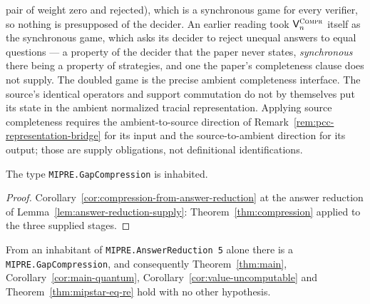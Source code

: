 pair of weight zero and rejected), which is a synchronous game for every verifier, so nothing
is presupposed of the decider. An earlier reading took $\mathsf{V}^{\textsc{Compr}}_n$ itself as the synchronous
game, which asks its decider to reject unequal answers to equal questions --- a property of
the decider that the paper never states, \emph{synchronous} there being a property of
strategies, and one the paper's completeness clause does not supply. The doubled game
is the precise ambient completeness interface. The source's identical operators and
support commutation do not by themselves put its state in the ambient normalized
tracial representation. Applying source completeness requires the ambient-to-source
direction of Remark~\ref{rem:pcc-representation-bridge} for its input and the
source-to-ambient direction for its output; those are supply obligations, not
definitional identifications.

\begin{theorem}
\label{thm:compression-target}
\leanok
The type \texttt{MIPRE.GapCompression} is inhabited.
\end{theorem}

\begin{proof}
\leanok
Corollary~\ref{cor:compression-from-answer-reduction} at the answer reduction of
Lemma~\ref{lem:answer-reduction-supply}: Theorem~\ref{thm:compression} applied to the three
supplied stages.
\end{proof}

\begin{corollary}[Compression, and $\MIPstar = \RE$, from answer reduction alone]
\label{cor:compression-from-answer-reduction}
\leanok
From an inhabitant of \texttt{MIPRE.AnswerReduction 5} alone there is a
\texttt{MIPRE.GapCompression}, and consequently Theorem~\ref{thm:main},
Corollary~\ref{cor:main-quantum}, Corollary~\ref{cor:value-uncomputable} and
Theorem~\ref{thm:mipstar-eq-re} hold with no other hypothesis.
\end{corollary}

